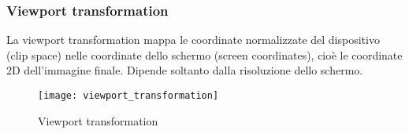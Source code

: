 \documentclass[a4paper]{article}
\begin{document}
\subsubsection{Viewport transformation}
La viewport transformation mappa le coordinate normalizzate del dispositivo (clip space)
nelle coordinate dello schermo (screen coordinates), cioè le coordinate 2D dell'immagine
finale. Dipende soltanto dalla risoluzione dello schermo.
\begin{figure}[H]
  \centering
  \texttt{[image: viewport\_transformation]}
  \caption{Viewport transformation}
\end{figure}
\end{document}
